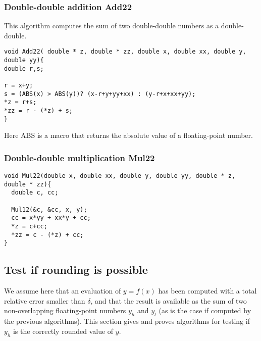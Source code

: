\subsubsection{Double-double addition {Add22}}
  
This algorithm computes the sum of two double-double numbers as a double-double.

\begin{lstlisting}[label={Add22},caption={Add22},firstnumber=1]
void Add22( double * z, double * zz, double x, double xx, double y, double yy){
double r,s;

r = x+y;
s = (ABS(x) > ABS(y))? (x-r+y+yy+xx) : (y-r+x+xx+yy);
*z = r+s;
*zz = r - (*z) + s;
}
\end{lstlisting}

Here ABS is a macro that returns the absolute value of a floating-point number.


\subsubsection{Double-double multiplication {Mul22}}

\begin{lstlisting}[label={Mul22},caption={Mul22},firstnumber=1]
void Mul22(double x, double xx, double y, double yy, double * z, double * zz){
  double c, cc;
  
  Mul12(&c, &cc, x, y);
  cc = x*yy + xx*y + cc;
  *z = c+cc;
  *zz = c - (*z) + cc;
}  
\end{lstlisting}





\subsection{Test if rounding is possible\label{section:testrounding}}

We assume here that an evaluation of $y=f(x)$ has been computed with a
total relative error smaller than $\delta$, and that the result is
available as the sum of two non-overlapping floating-point numbers
$y_h$ and $y_l$ (as is the case if computed by the previous
algorithms). This section gives and proves algorithms for testing if
$y_h$ is the correctly rounded value of $y$.



